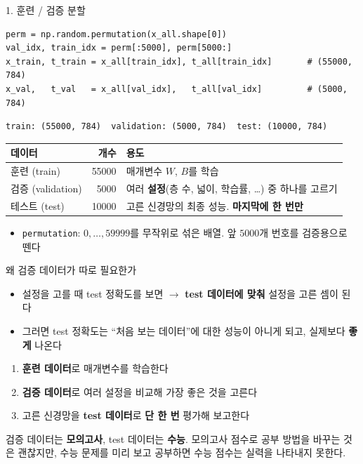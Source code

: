 \documentclass[aspectratio=169,11pt]{beamer}
\newcommand{\code}[1]{\texttt{#1}}
\begin{document}
\begin{frame}[fragile]{1. 훈련 / 검증 분할}
\begin{lstlisting}
perm = np.random.permutation(x_all.shape[0])
val_idx, train_idx = perm[:5000], perm[5000:]
x_train, t_train = x_all[train_idx], t_all[train_idx]       # (55000, 784)
x_val,   t_val   = x_all[val_idx],   t_all[val_idx]         # (5000, 784)
\end{lstlisting}
\begin{lstlisting}[style=outstyle]
train: (55000, 784)  validation: (5000, 784)  test: (10000, 784)
\end{lstlisting}
\centering
\footnotesize
\renewcommand{\arraystretch}{1.15}
\begin{tabular}{lrl}
\toprule
\textbf{데이터} & \textbf{개수} & \textbf{용도} \\
\midrule
훈련 (train) & 55000 & 매개변수 $W$, $B$를 학습 \\
검증 (validation) & 5000 & 여러 \textbf{설정}(층 수, 넓이, 학습률, \ldots) 중 하나를 고르기 \\
테스트 (test) & 10000 & 고른 신경망의 최종 성능. \textbf{마지막에 한 번만} \\
\bottomrule
\end{tabular}
\raggedright
\small
\begin{itemize}
\item \code{permutation}: $0,\ldots,59999$를 무작위로 섞은 배열. 앞 $5000$개 번호를 검증용으로 뗀다
\end{itemize}
\end{frame}

\begin{frame}{왜 검증 데이터가 따로 필요한가}
\begin{itemize}
\item 설정을 고를 때 test 정확도를 보면 $\to$ \textbf{test 데이터에 맞춰} 설정을 고른 셈이 된다
\item 그러면 test 정확도는 ``처음 보는 데이터''에 대한 성능이 아니게 되고, 실제보다 \textbf{좋게} 나온다
\end{itemize}
\vskip2mm
\begin{keybox}[세 데이터의 역할]
\begin{enumerate}
\item \textbf{훈련 데이터}로 매개변수를 학습한다
\item \textbf{검증 데이터}로 여러 설정을 비교해 가장 좋은 것을 고른다
\item 고른 신경망을 \textbf{test 데이터}로 \textbf{단 한 번} 평가해 보고한다
\end{enumerate}
\end{keybox}
\begin{thinkbox}[비유]
\small
검증 데이터는 \textbf{모의고사}, test 데이터는 \textbf{수능}. 모의고사 점수로 공부 방법을 바꾸는 것은 괜찮지만,
수능 문제를 미리 보고 공부하면 수능 점수는 실력을 나타내지 못한다.
\end{thinkbox}
\end{frame}
\end{document}
